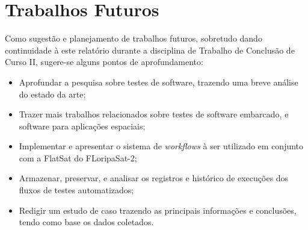\section{Trabalhos Futuros}
Como sugestão e planejamento de trabalhos futuros, sobretudo dando continuidade à este relatório durante a disciplina de Trabalho de Conclusão de Curso II, sugere-se alguns pontos de aprofundamento:
\begin{itemize}
    \item Aprofundar a pesquisa sobre testes de software, trazendo uma breve análise do estado da arte;
    \item Trazer mais trabalhos relacionados sobre testes de software embarcado, e software para aplicações espaciais;
    \item Implementar e apresentar o sistema de \textit{workflows} à ser utilizado em conjunto com a FlatSat do FLoripaSat-2;
    \item Armazenar, preservar, e analisar os registros e histórico de execuções dos fluxos de testes automatizados;
    \item Redigir um estudo de caso trazendo as principais informações e conclusões, tendo como base os dados coletados.
\end{itemize}